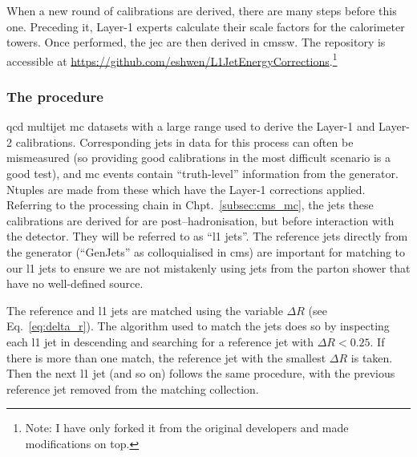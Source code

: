When a new round of calibrations are derived, there are many steps before this one. Preceding it, Layer-1 experts calculate their scale factors for the calorimeter towers. Once performed, the \acrlong{jec} are then derived in \acrshort{cmssw}. The repository is accessible at \url{https://github.com/eshwen/L1JetEnergyCorrections}.\footnote{Note: I have only forked it from the original developers and made modifications on top.}




\subsubsection{The procedure}
\label{subsubsec:detector_jec_procedure}

\acrshort{qcd} multijet \acrshort{mc} datasets with a large \pt range used to derive the Layer-1 and Layer-2 calibrations. Corresponding \glspl{jet} in data for this process can often be mismeasured (so providing good calibrations in the most difficult scenario is a good test), and \acrshort{mc} events contain ``truth-level'' information from the generator. Ntuples are made from these which have the Layer-1 corrections applied. Referring to the processing chain in Chpt.~\ref{subsec:cms_mc}, the \glspl{jet} these calibrations are derived for are post--hadronisation, but before interaction with the detector. They will be referred to as ``\acrfull{l1} \glspl{jet}''. The reference \glspl{jet} directly from the generator (``GenJets'' as colloquialised in \acrshort{cms}) are important for matching to our \acrshort{l1} \glspl{jet} to ensure we are not mistakenly using \glspl{jet} from the parton shower that have no well-defined source.

The reference and \acrshort{l1} \glspl{jet} are matched using the variable $\Delta R$ (see Eq.~\ref{eq:delta_r}). The algorithm used to match the \glspl{jet} does so by inspecting each \acrshort{l1} \gls{jet} in descending \pt and searching for a reference \gls{jet} with $\Delta R < 0.25$. If there is more than one match, the reference \gls{jet} with the smallest $\Delta R$ is taken. Then the next \acrshort{l1} jet (and so on) follows the same procedure, with the previous reference \gls{jet} removed from the matching collection.

